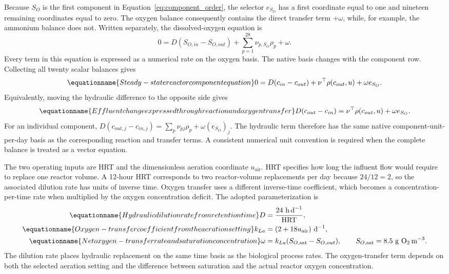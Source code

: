 Because $S_O$ is the first component in Equation~\eqref{eq:component_order}, the selector $e_{S_O}$ has a first coordinate equal to one and nineteen remaining coordinates equal to zero. The oxygen balance consequently contains the direct transfer term $+\omega$, while, for example, the ammonium balance does not. Written separately, the dissolved-oxygen equation is
\[
0=D(S_{O,in}-S_{O,out})+\sum_{p=1}^{28}\nu_{p,S_O}\rho_p+\omega.
\]
Every term in this equation is expressed as a numerical rate on the oxygen basis. The native basis changes with the component row. Collecting all twenty scalar balances gives
\begin{equation}
\equationname{Steady-state reactor component equation}
0=D(c_{in}-c_{out})+\nu^\top\rho(c_{out},u)+\omega e_{S_O}.
\label{eq:reactor_steady_balance}
\end{equation}
Equivalently, moving the hydraulic difference to the opposite side gives
\begin{equation}
\equationname{Effluent change expressed through reaction and oxygen transfer}
D(c_{out}-c_{in})=\nu^\top\rho(c_{out},u)+\omega e_{S_O}.
\label{eq:reactor_steady_difference}
\end{equation}
For an individual component,
$D(c_{out,j}-c_{in,j})=\sum_p\nu_{pj}\rho_p+\omega(e_{S_O})_j$.
The hydraulic term therefore has the same native component-unit-per-day basis as the corresponding reaction and transfer terms. A consistent numerical unit convention is required when the complete balance is treated as a vector equation.

The two operating inputs are HRT and the dimensionless aeration coordinate $u_{\mathrm{air}}$. HRT specifies how long the influent flow would require to replace one reactor volume. A 12-hour HRT corresponds to two reactor-volume replacements per day because $24/12=2$, so the associated dilution rate has units of inverse time. Oxygen transfer uses a different inverse-time coefficient, which becomes a concentration-per-time rate when multiplied by the oxygen concentration deficit. The adopted parameterization is
\begin{align}
\equationname{Hydraulic dilution rate from retention time}
D&=\frac{24\ \mathrm{h\,d}^{-1}}{\mathrm{HRT}},\label{eq:reactor_dilution}\\
\equationname{Oxygen-transfer coefficient from the aeration setting}
k_{La}&=(2+18u_{\mathrm{air}})\ \mathrm{d}^{-1},\label{eq:reactor_transfer_coefficient}\\
\equationname{Net oxygen-transfer rate and saturation concentration}
\omega&=k_{La}(S_{O,\mathrm{sat}}-S_{O,out}),\qquad
S_{O,\mathrm{sat}}=8.5\ \mathrm{g\ O_2\,m}^{-3}.
\label{eq:reactor_oxygen_transfer}
\end{align}
The dilution rate places hydraulic replacement on the same time basis as the biological process rates. The oxygen-transfer term depends on both the selected aeration setting and the difference between saturation and the actual reactor oxygen concentration.

